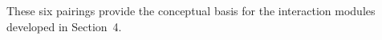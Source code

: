 \documentclass[manuscript,screen,review,anonymous]{acmart}
\begin{document}
These six pairings provide the conceptual basis for the interaction modules
developed in Section~4.



\end{document}
